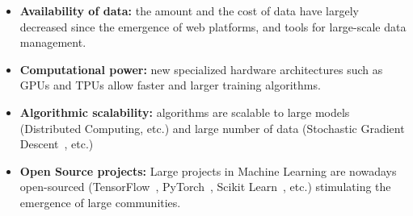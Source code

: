 \begin{itemize}
    \item \textbf{Availability of data:} the amount and the cost of data have largely decreased since the emergence of web platforms, and tools for large-scale data management.
    \item \textbf{Computational power:} new specialized hardware architectures such as GPUs and TPUs allow faster and larger training algorithms.
    \item \textbf{Algorithmic scalability:} algorithms are scalable to large models (Distributed Computing, etc.) and large number of data (Stochastic Gradient Descent~\citep{bottou2010large}, etc.)
    \item \textbf{Open Source projects:} Large projects in Machine Learning are nowadays open-sourced (TensorFlow~\citep{abadi2016deep}, PyTorch~\citep{paszke2017automatic}, Scikit Learn~\citep{sklearn}, etc.) stimulating the emergence of large communities.
\end{itemize}

